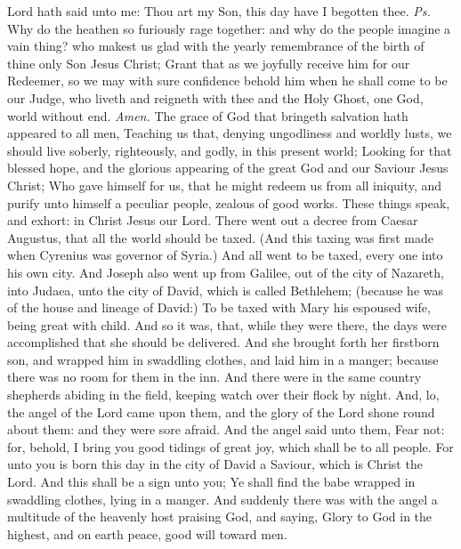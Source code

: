 \introit
{} Lord hath said unto me: Thou art my Son, this day have I begotten thee. \textit{Ps.} Why do the heathen so furiously rage together: and why do the people imagine a vain thing?
\collect
{} who makest us glad with the yearly remembrance of the birth of thine only Son Jesus Christ; Grant that as we joyfully receive him for our Redeemer, so we may with sure confidence behold him when he shall come to be our Judge, who liveth and reigneth with thee and the Holy Ghost, one God, world without end. \textit{Amen.}
 The grace of God that bringeth salvation hath appeared to all men, Teaching us that, denying ungodliness and worldly lusts, we should live soberly, righteously, and godly, in this present world; Looking for that blessed hope, and the glorious appearing of the great God and our Saviour Jesus Christ; Who gave himself for us, that he might redeem us from all iniquity, and purify unto himself a peculiar people, zealous of good works. These things speak, and exhort: in Christ Jesus our Lord.
 There went out a decree from Caesar Augustus, that all the world should be taxed. (And this taxing was first made when Cyrenius was governor of Syria.) And all went to be taxed, every one into his own city. And Joseph also went up from Galilee, out of the city of Nazareth, into Judaea, unto the city of David, which is called Bethlehem; (because he was of the house and lineage of David:) To be taxed with Mary his espoused wife, being great with child. And so it was, that, while they were there, the days were accomplished that she should be delivered. And she brought forth her firstborn son, and wrapped him in swaddling clothes, and laid him in a manger; because there was no room for them in the inn. And there were in the same country shepherds abiding in the field, keeping watch over their flock by night. And, lo, the angel of the Lord came upon them, and the glory of the Lord shone round about them: and they were sore afraid. And the angel said unto them, Fear not: for, behold, I bring you good tidings of great joy, which shall be to all people. For unto you is born this day in the city of David a Saviour, which is Christ the Lord. And this shall be a sign unto you; Ye shall find the babe wrapped in swaddling clothes, lying in a manger. And suddenly there was with the angel a multitude of the heavenly host praising God, and saying, Glory to God in the highest, and on earth peace, good will toward men.
